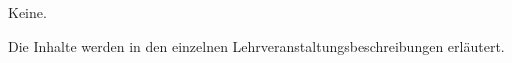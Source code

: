 \begin{module}
\begin{styleenv}
\begin{assessment}
\end{assessment}

\begin{conditions}Keine.\end{conditions}


\end{styleenv}

\begin{learningoutcomes}

\end{learningoutcomes}

\begin{content}
Die Inhalte werden in den einzelnen Lehrveranstaltungsbeschreibungen erläutert.


\end{content}



\end{module}

